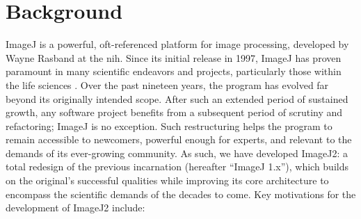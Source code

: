 \documentclass{bmcart}
\begin{document}


\section*{Background}
ImageJ \cite{imagej_history} is a powerful, oft-referenced platform for image
processing, developed by Wayne Rasband at the \acrfull{nih}. Since its initial
release in 1997, ImageJ has proven paramount in many scientific endeavors and
projects, particularly those within the life sciences \cite{imagej_review}.
Over the past nineteen years, the program has evolved far beyond its originally
intended scope. After such an extended period of sustained growth, any software
project benefits from a subsequent period of scrutiny and refactoring; ImageJ
is no exception. Such restructuring helps the program to remain accessible to
newcomers, powerful enough for experts, and relevant to the demands of its
ever-growing community. As such, we have developed ImageJ2: a total redesign of
the previous incarnation (hereafter ``ImageJ 1.x''), which builds on the
original's successful qualities while improving its core architecture to
encompass the scientific demands of the decades to come. Key motivations for
the development of ImageJ2 include:
\end{document}
